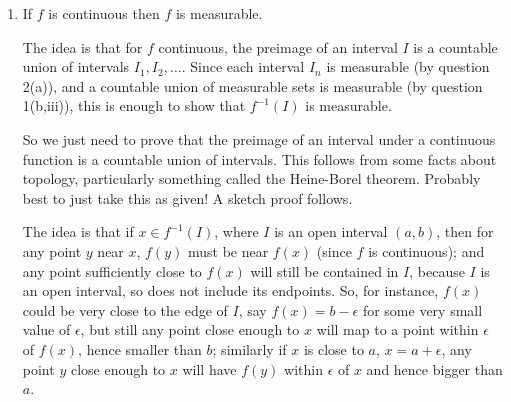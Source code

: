 \documentclass{article}
\let\take\setminus
\let\lamdba\lambda
\begin{document}
\begin{enumerate}
\begin{enumerate}
{							\iffalse%
							So let $E$ be a measurable set. To show that $f^{-1}(E)$ is measurable, we need to show that for any $A\subseteq \mathbb{R}$,
							\[\lambda^+(A)=\lamdba^+(A\cap f^{-1}(E))+\lambda^+(A\cap(\mathbb{R}\take f^{-1}(E))).\]
							
							Take a sequence of intervals $I_n$ which cover $E$, so
							\[E\subseteq \bigcup_{n=1}^\infty I_n.\]
							Then, taking preimages,
							\[f^{-1}(E)\subseteq \bigcup_{n=1}^\infty f^{-1}(I_n),\]
							because if $x\in f^{-1}(E)$, then $f(x)\in E$, so $f(x)$ is in the union of the $I_n$, so $f(x)$ is in some particular $I_k$, so $x\in f^{-1}(I_k)$, so $x$ is in the union of the $f^{-1}(I_n)$. Therefore
							\[A\cap f^{-1}(E)\subseteq A\cap\bigcup_{n=1}^\infty f^{-1}(I_n)=\bigcup_{n=1}^\infty (A\cap f^{-1}(I_n)).\]
							Taking outer measures and using question 1(a,iii):
							\[\lambda^+(A\cap f^{-1}(E))\leq \sum_{n=1}^\infty \lambda^+(A\cap f^{-1}(I_n)).\]
							Since $f$ is measurable and each $I_n$ is an interval, $f^{-1}(I_n)$ is measurable for each $n$. Moreover, $f^{-1}(E)$ is covered by the sets $f^{-1}(I_n)$, since $E$ is covered by the $I_n$. So we \fi%
						}
					
			\item If $f$ is continuous then $f$ is measurable.
			
						{\color{blue}
							The idea is that for $f$ continuous, the preimage of an interval $I$ is a countable union of intervals $I_1,I_2,\hdots$. Since each interval $I_n$ is measurable (by question 2(a)), and a countable union of measurable sets is measurable (by question 1(b,iii)), this is enough to show that $f^{-1}(I)$ is measurable.
							
							So we just need to prove that the preimage of an interval under a continuous function is a countable union of intervals. This follows from some facts about topology, particularly something called the Heine-Borel theorem. Probably best to just take this as given! A sketch proof follows.\bigskip
							
							The idea is that if $x\in f^{-1}(I)$, where $I$ is an open interval $(a,b)$, then for any point $y$ near $x$, $f(y)$ must be near $f(x)$ (since $f$ is continuous); and any point sufficiently close to $f(x)$ will still be contained in $I$, because $I$ is an open interval, so does not include its endpoints. So, for instance, $f(x)$ could be very close to the edge of $I$, say $f(x)=b-\epsilon$ for some very small value of $\epsilon$, but still any point close enough to $x$ will map to a point within $\epsilon$ of $f(x)$, hence smaller than $b$; similarly if $x$ is close to $a$, $x=a+\epsilon$, any point $y$ close enough to $x$ will have $f(y)$ within $\epsilon$ of $x$ and hence bigger than $a$.
							
}
\end{enumerate}
\end{enumerate}
\end{document}
